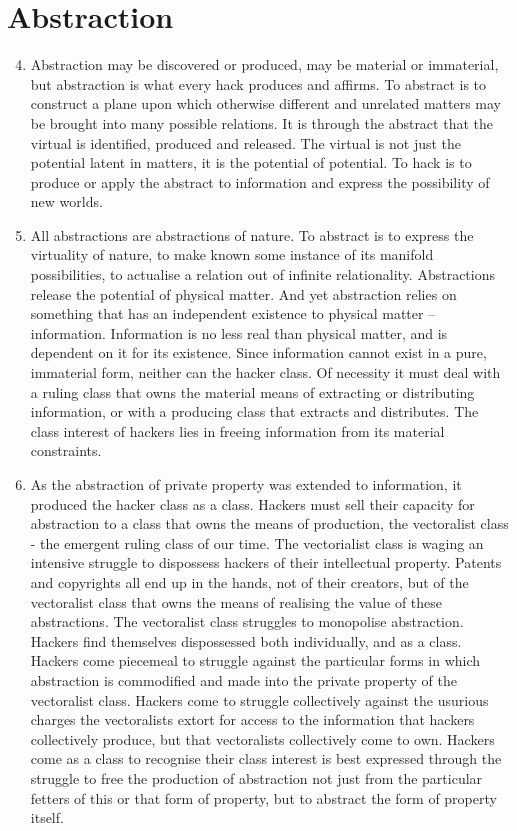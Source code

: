 \documentclass[letterpaper,12pt,english]{sphinxmanual}
\begin{document}
\section{Abstraction}
\label{wark:abstraction}\begin{enumerate}
\setcounter{enumi}{3}
\item {} 
Abstraction may be discovered or produced, may be material or immaterial, but abstraction is what every hack produces and affirms. To abstract is to construct a plane upon which otherwise different and unrelated matters may be brought into many possible relations. It is through the abstract that the virtual is identified, produced and released. The virtual is not just the potential latent in matters, it is the potential of potential. To hack is to produce or apply the abstract to information and express the possibility of new worlds.

\item {} 
All abstractions are abstractions of nature. To abstract is to express the virtuality of nature, to make known some instance of its manifold possibilities, to actualise a relation out of infinite relationality. Abstractions release the potential of physical matter. And yet abstraction relies on something that has an independent existence to physical matter -- information. Information is no less real than physical matter, and is dependent on it for its existence. Since information cannot exist in a pure, immaterial form, neither can the hacker class. Of necessity it must deal with a ruling class that owns the material means of extracting or distributing information, or with a producing class that extracts and distributes. The class interest of hackers lies in freeing information from its material constraints.

\item {} 
As the abstraction of private property was extended to information, it produced the hacker class as a class. Hackers must sell their capacity for abstraction to a class that owns the means of production, the vectoralist class - the emergent ruling class of our time. The vectorialist class is waging an intensive struggle to dispossess hackers of their intellectual property. Patents and copyrights all end up in the hands, not of their creators, but of the vectoralist class that owns the means of realising the value of these abstractions. The vectoralist class struggles to monopolise abstraction. Hackers find themselves dispossessed both individually, and as a class. Hackers come piecemeal to struggle against the particular forms in which abstraction is commodified and made into the private property of the vectoralist class. Hackers come to struggle collectively against the usurious charges the vectoralists extort for access to the information that hackers collectively produce, but that vectoralists collectively come to own. Hackers come as a class to recognise their class interest is best expressed through the struggle to free the production of abstraction not just from the particular fetters of this or that form of property, but to abstract the form of property itself.


\end{enumerate}
\end{document}
